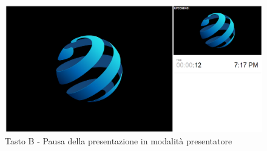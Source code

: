 \begin{itemize}
	\begin{figure}[H] 
		\centering 
		\includegraphics[scale=0.30] {img/b1.png}
		\caption{Tasto B - Pausa della presentazione in modalità presentatore} 
	\end{figure}
\end{itemize}
